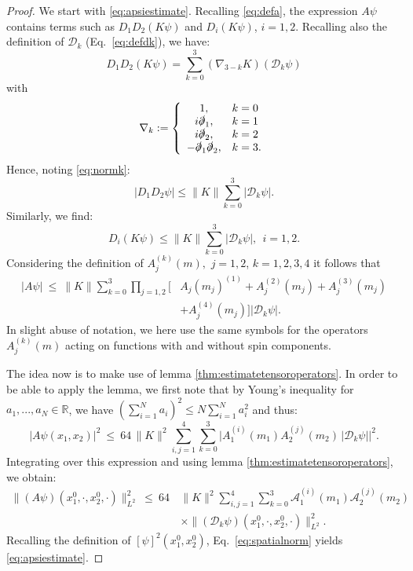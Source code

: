 \documentclass[b5paper,draft,openbib,12pt]{memoir}
\newcommand{\R}{\mathbb{R}}
\begin{document}
\begin{proof}
	We start with \eqref{eq:apsiestimate}. Recalling \eqref{eq:defa}, the expression $A\psi$ contains terms such as $D_1 D_2 (K \psi)$ and $D_i(K\psi)$, $i=1,2$. Recalling also the definition of $\mathcal{D}_k$ (Eq.\ \eqref{eq:defdk}), we have:
\begin{equation}
	D_1 D_2 (K\psi) = \sum_{k=0}^3 (\nabla_{3-k}K)(\mathcal{D}_k \psi)
\end{equation}
with
\begin{equation}
\nabla_k := \left\{\begin{array}{cl} 1, & k=0\\ i\slashed{\partial}_1, & k=1 \\ i \slashed{\partial}_2, & k=2 \\ -\slashed{\partial}_1\slashed{\partial}_2, & k=3. \end{array}\right.
\end{equation}
Hence, noting \eqref{eq:normk}:
\begin{equation}
	|D_1D_2 \psi| \leq \| K \| \sum_{k=0}^3 |\mathcal{D}_k \psi|.
\end{equation}
Similarly, we find:
\begin{equation}
	D_i (K\psi) \leq \| K\| \sum_{k=0}^3 |\mathcal{D}_k \psi|,~~i=1,2.
\end{equation}
Considering the definition of $A_j^{(k)}(m),$ $j=1,2$, $k=1,2,3,4$ 
it follows that
\begin{align}\nonumber
  |A\psi| ~\leq ~\|K\| \sum_{k=0}^3   \prod_{j=1,2} \big[ &A_j(m_j)^{(1)} + A_j^{(2)}(m_j) + A_j^{(3)}(m_j)\\
  & + A_j^{(4)}(m_j)\big]  |\mathcal{D}_k \psi|.
\end{align}
In slight abuse of notation, we here use the same symbols for the 
operators $A_j^{(k)}(m)$ acting on functions with and without spin 
components.

The idea now is to make use of lemma 
\ref{thm:estimatetensoroperators}. In order to be able to apply the 
lemma, we first note that by Young's inequality for 
$a_1,...,a_N \in \R$, we have 
$\left(\sum_{i=1}^N a_i\right)^2 \leq N \sum_{i=1}^N a_i^2$ and thus:
\begin{equation}
	|A\psi (x_1,x_2)|^2 ~\leq~ 64\, \|K\|^2 \sum_{i,j=1}^4 \sum_{k=0}^3 \big| A_1^{(i)}(m_1) A_2^{(j)}(m_2) \, |\mathcal{D}_k \psi|\big|^2.
\end{equation}
Integrating over this expression and using lemma 
\ref{thm:estimatetensoroperators}, we obtain:
\begin{align}\nonumber
    \| (A \psi)(x_1^0,\cdot,x_2^0,\cdot)\|^2_{L^2} ~\leq ~64 \, &\|K\|^2\sum_{i,j=1}^4 \sum_{k=0}^3 \mathcal{A}_1^{(i)}(m_1) \mathcal{A}_2^{(j)}(m_2) \,\\
    &\times \| (\mathcal{D}_k \psi)(x_1^0,\cdot,x_2^0,\cdot) \|^2_{L^2}.
\end{align}
Recalling the definition of $[\psi]^2(x_1^0,x_2^0)$, Eq.\ 
\eqref{eq:spatialnorm} yields \eqref{eq:apsiestimate}.


\end{proof}
\end{document}
